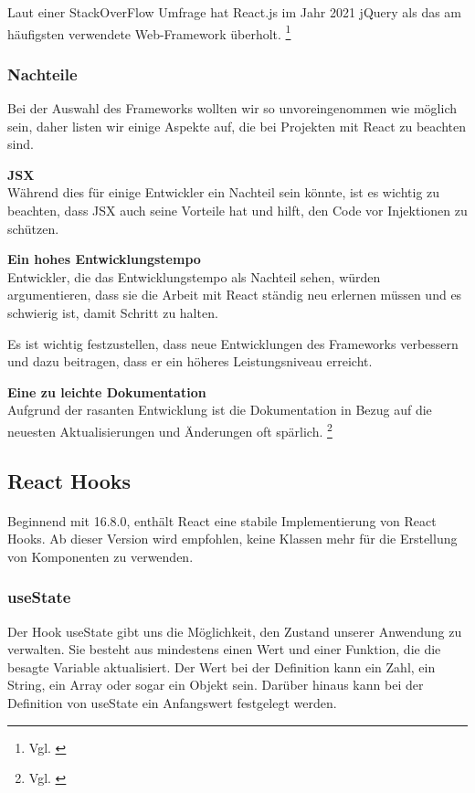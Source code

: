 Laut einer StackOverFlow Umfrage hat React.js im Jahr 2021 jQuery als das am häufigsten verwendete Web-Framework überholt.
\footnote{ Vgl. \cite{SO01}}
\newpage

\subsubsection{Nachteile}
Bei der Auswahl des Frameworks wollten wir so unvoreingenommen wie möglich sein, daher listen wir einige Aspekte auf, die bei Projekten mit React zu beachten sind.
\newline

\textbf{JSX}\\
Während dies für einige Entwickler ein Nachteil sein könnte, ist es wichtig zu beachten, dass JSX auch seine Vorteile hat und hilft, den Code vor Injektionen zu schützen.
\newline

\textbf{Ein hohes Entwicklungstempo}\\
Entwickler, die das Entwicklungstempo als Nachteil sehen, würden argumentieren, dass sie die Arbeit mit React ständig neu erlernen müssen und es schwierig ist, damit Schritt zu halten.

Es ist wichtig festzustellen, dass neue Entwicklungen des Frameworks verbessern und dazu beitragen, dass er ein höheres Leistungsniveau erreicht. 
\newline

\textbf{Eine zu leichte Dokumentation}\\
Aufgrund der rasanten Entwicklung ist die Dokumentation in Bezug auf die neuesten Aktualisierungen und Änderungen oft spärlich. 
\footnote{ Vgl. \cite{R01}}

\subsection{React Hooks}
\paragraph{}
Beginnend mit 16.8.0, enthält React eine stabile Implementierung von React Hooks. Ab dieser Version wird empfohlen, keine Klassen mehr für die Erstellung von Komponenten zu verwenden.

\subsubsection{useState}
Der Hook useState gibt uns die Möglichkeit, den Zustand unserer Anwendung zu verwalten. Sie besteht aus mindestens einen Wert und einer Funktion, die die besagte Variable aktualisiert.
Der Wert bei der Definition kann ein Zahl, ein String, ein Array oder sogar ein Objekt sein.
Darüber hinaus kann bei der Definition von useState ein Anfangswert festgelegt werden.

